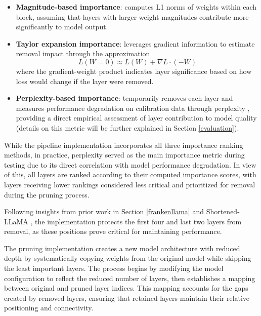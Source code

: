 \begin{itemize}
   \item \textbf{Magnitude-based importance}: computes L1 norms of weights within each block, assuming that layers with larger weight magnitudes contribute more significantly to model output.
   
   \item \textbf{Taylor expansion importance}: leverages gradient information to estimate removal impact through the approximation 
   \begin{equation}
    L(W = 0) \approx L(W) + \nabla L \cdot (-W)
   \end{equation}
   where the gradient-weight product indicates layer significance based on how loss would change if the layer were removed.
   
   \item \textbf{Perplexity-based importance}: temporarily removes each layer and measures performance degradation on calibration data through perplexity \cite{perplexity}, providing a direct empirical assessment of layer contribution to model quality (details on this metric will be further explained in Section \ref{evaluation}).
\end{itemize}

While the pipeline implementation incorporates all three importance ranking methods, in practice, perplexity served as the main importance metric during testing due to its direct correlation with model performance degradation. In view of this, all layers are ranked according to their computed importance scores, with layers receiving lower rankings considered less critical and prioritized for removal during the pruning process.

Following insights from prior work in Section \ref{frankenllama} and Shortened-LLaMA \cite{shortened_llama}, the implementation protects the first four and last two layers from removal, as these positions prove critical for maintaining performance.

The pruning implementation creates a new model architecture with reduced depth by systematically copying weights from the original model while skipping the least important layers. The process begins by modifying the model configuration to reflect the reduced number of layers, then establishes a mapping between original and pruned layer indices. This mapping accounts for the gaps created by removed layers, ensuring that retained layers maintain their relative positioning and connectivity.

